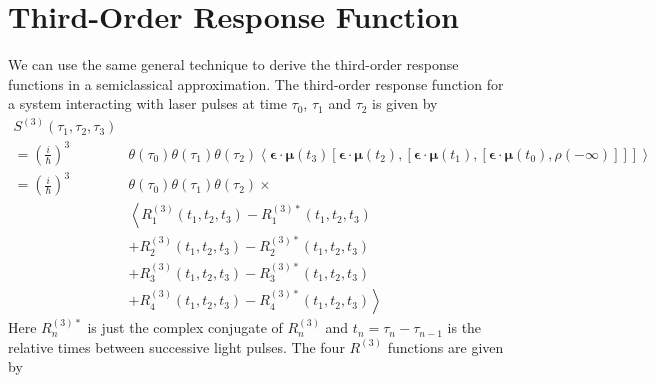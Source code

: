 \documentclass{article}
\newcommand{\ensb}[1]{\left\langle#1\right\rangle}
\newcommand{\comm}[2]{\left[#1,#2\right]}
\newcommand{\vect}[1]{\ensuremath{\boldsymbol{\mathbf{#1}}}}
\begin{document}
\section{Third-Order Response Function}
We can use the same general technique to derive the third-order response functions in a semiclassical approximation.
The third-order response function for a system interacting with laser pulses at time $\tau_{0}$, $\tau_{1}$ and $\tau_{2}$ is given by\cite{Mukamel1995,Hamm2011}
\begin{equation}
\begin{split}
S^{(3)}(\tau_{1},\tau_{2},\tau_{3})&\\
 =\left(\frac{i}{\hbar}\right)^{3}&\theta(\tau_{0})\theta(\tau_{1})\theta(\tau_{2})
 \ensb{\vect\epsilon\cdot\vect\mu(t_{3})
 \comm{\vect\epsilon\cdot\vect\mu(t_{2})}{
 \comm{\vect\epsilon\cdot\vect\mu(t_{1})}{
 \comm{\vect\epsilon\cdot\vect\mu(t_{0})}{
 \rho(-\infty)}}}}\\
 =\left(\frac{i}{\hbar}\right)^{3}&\theta(\tau_{0})\theta(\tau_{1})\theta(\tau_{2})\times\\
            &\left\langle R^{(3)}_{1}(t_{1},t_{2},t_{3})-R^{(3)*}_{1}(t_{1},t_{2},t_{3})\right.\\
            &+R^{(3)}_{2}(t_{1},t_{2},t_{3})-R^{(3)*}_{2}(t_{1},t_{2},t_{3})\\ 
            &+R^{(3)}_{3}(t_{1},t_{2},t_{3})-R^{(3)*}_{3}(t_{1},t_{2},t_{3})\\
            &\left.+R^{(3)}_{4}(t_{1},t_{2},t_{3})-R^{(3)*}_{4}(t_{1},t_{2},t_{3})\right\rangle
\end{split}
\end{equation}
Here $R_{n}^{(3)*}$ is just the complex conjugate of $R_{n}^{(3)}$ and $t_{n}=\tau_{n}-\tau_{n-1}$ is the relative times between successive light pulses.
The four $R^{(3)}$ functions are given by
\end{document}
